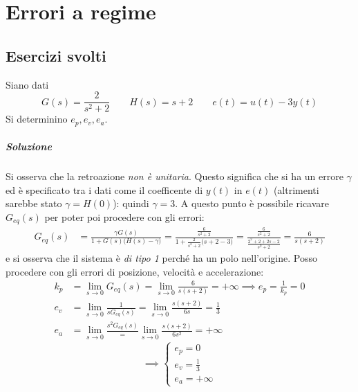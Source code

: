 \chapter{Errori a regime}

\section{Esercizi svolti}
\begin{esercizio}
Siano dati
\[
	G(s) = \frac{2}{s^2+2} \qquad H(s) = s+2 \qquad e(t) = u(t) -3y(t)
\]
Si determinino \(e_p, e_v, e_a\).

\paragraph{Soluzione}
Si osserva che la retroazione \emph{non è unitaria}. Questo significa che si ha un errore \(\gamma\) ed è specificato tra i dati come il coefficente di \(y(t)\) in \(e(t)\) (altrimenti sarebbe stato \(\gamma = H(0)\)): quindi \(\gamma = 3\).
A questo punto è possibile ricavare \(G_{eq}(s)\) per poter poi procedere con gli errori:
\begin{align*}
	G_{eq}(s) &= \frac{\gamma G(s)}{1+G(s)\bigl(H(s)-\gamma\bigr)} =
			\frac{\frac{6}{s^2+2}}{1+\frac{2}{s^2+2}\bigl(s+2-3\bigr)} =
			\frac{\frac{6}{s^2+2}}{\frac{2^2+2+2s-2}{s^2+2}} =
		  	\frac{6}{s(s+2)}
\end{align*}
e si osserva che il sistema è \emph{di tipo 1} perché ha un polo nell'origine.
Posso procedere con gli errori di posizione, velocità e accelerazione:
\begin{align*}
	k_p &= \lim_{s\to0} G_{eq}(s) = \lim_{s\to0} \frac{6}{s(s+2)} = +\infty \implies e_p = \frac{1}{k_p} = 0 \\
	e_v &= \lim_{s\to0} \frac{1}{s G_{eq}(s)} = \lim_{s\to0} \frac{s(s+2)}{6s} = \frac{1}{3} \\
	e_a &= \lim_{s\to0} \frac{s^2 G_{eq}(s)} = \lim_{s\to0} \frac{s(s+2)}{6s^2} = +\infty
\end{align*}
\[\implies \begin{cases}
	e_p = 0 \\
	e_v = \frac{1}{3} \\
	e_a = +\infty
\end{cases}\]
\end{esercizio}

